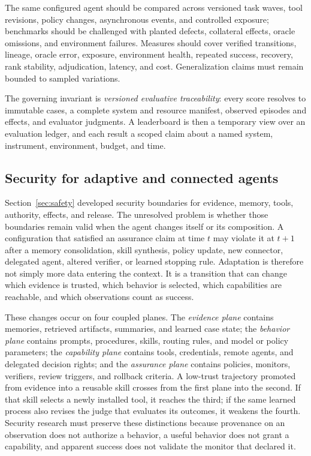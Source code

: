 The same configured agent should be compared across versioned task waves, tool revisions, policy changes, asynchronous events, and controlled exposure; benchmarks should be challenged with planted defects, collateral effects, oracle omissions, and environment failures. Measures should cover verified transitions, lineage, oracle error, exposure, environment health, repeated success, recovery, rank stability, adjudication, latency, and cost. Generalization claims must remain bounded to sampled variations.

The governing invariant is \emph{versioned evaluative traceability}: every score resolves to immutable cases, a complete system and resource manifest, observed episodes and effects, and evaluator judgments. A leaderboard is then a temporary view over an evaluation ledger, and each result a scoped claim about a named system, instrument, environment, budget, and time.

\subsection{Security for adaptive and connected agents}

Section~\ref{sec:safety} developed security boundaries for evidence, memory, tools, authority, effects, and release. The unresolved problem is whether those boundaries remain valid when the agent changes itself or its composition. A configuration that satisfied an assurance claim at time $t$ may violate it at $t+1$ after a memory consolidation, skill synthesis, policy update, new connector, delegated agent, altered verifier, or learned stopping rule. Adaptation is therefore not simply more data entering the context. It is a transition that can change which evidence is trusted, which behavior is selected, which capabilities are reachable, and which observations count as success.

These changes occur on four coupled planes. The \emph{evidence plane} contains memories, retrieved artifacts, summaries, and learned case state; the \emph{behavior plane} contains prompts, procedures, skills, routing rules, and model or policy parameters; the \emph{capability plane} contains tools, credentials, remote agents, and delegated decision rights; and the \emph{assurance plane} contains policies, monitors, verifiers, review triggers, and rollback criteria. A low-trust trajectory promoted from evidence into a reusable skill crosses from the first plane into the second. If that skill selects a newly installed tool, it reaches the third; if the same learned process also revises the judge that evaluates its outcomes, it weakens the fourth. Security research must preserve these distinctions because provenance on an observation does not authorize a behavior, a useful behavior does not grant a capability, and apparent success does not validate the monitor that declared it.


